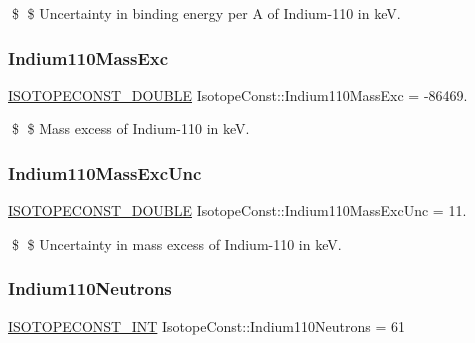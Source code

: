 \$ \$ Uncertainty in binding energy per A of Indium-\/110 in keV. \mbox{\label{group___isotope_const-_indium-_in110_gafb3084ef3de1ffc30f1478830eda8339}} 
\subsubsection{\texorpdfstring{Indium110\+Mass\+Exc}{Indium110MassExc}}
{\footnotesize\ttfamily \mbox{\hyperlink{group___isotope_const-_macros_ga8f45a7272ce02c0b4c65c44636ed719a}{I\+S\+O\+T\+O\+P\+E\+C\+O\+N\+S\+T\+\_\+\+D\+O\+U\+B\+LE}} Isotope\+Const\+::\+Indium110\+Mass\+Exc = -\/86469.}

\$ \$ Mass excess of Indium-\/110 in keV. \mbox{\label{group___isotope_const-_indium-_in110_ga13f943dd42b8c1345153fc0c58b29a2c}} 
\subsubsection{\texorpdfstring{Indium110\+Mass\+Exc\+Unc}{Indium110MassExcUnc}}
{\footnotesize\ttfamily \mbox{\hyperlink{group___isotope_const-_macros_ga8f45a7272ce02c0b4c65c44636ed719a}{I\+S\+O\+T\+O\+P\+E\+C\+O\+N\+S\+T\+\_\+\+D\+O\+U\+B\+LE}} Isotope\+Const\+::\+Indium110\+Mass\+Exc\+Unc = 11.}

\$ \$ Uncertainty in mass excess of Indium-\/110 in keV. \mbox{\label{group___isotope_const-_indium-_in110_gab02e4994dcbec53f0df51ac422ecd6f7}} 
\subsubsection{\texorpdfstring{Indium110\+Neutrons}{Indium110Neutrons}}
{\footnotesize\ttfamily \mbox{\hyperlink{group___isotope_const-_macros_ga5f18360b3e99483a35c32d789e62621c}{I\+S\+O\+T\+O\+P\+E\+C\+O\+N\+S\+T\+\_\+\+I\+NT}} Isotope\+Const\+::\+Indium110\+Neutrons = 61}

